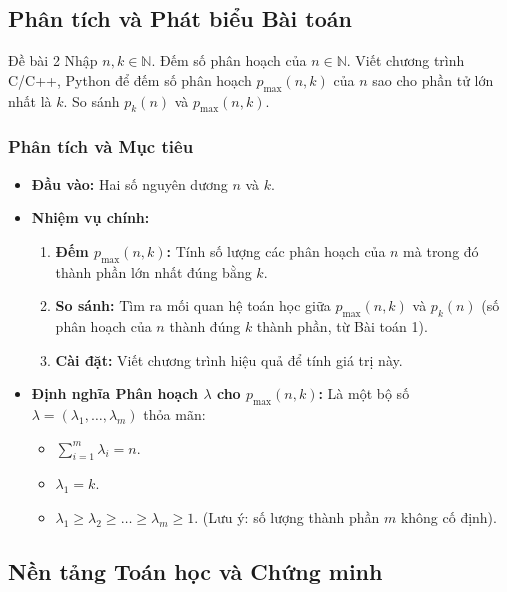 \documentclass[a4paper,12pt]{article}
\begin{document}
\subsection{Phân tích và Phát biểu Bài toán}

\begin{problembox}{Đề bài 2}
    Nhập $n, k \in \mathbb{N}$. Đếm số phân hoạch của $n \in \mathbb{N}$. Viết chương trình C/C++, Python để đếm số phân hoạch $p_{\max}(n, k)$ của $n$ sao cho phần tử lớn nhất là $k$. So sánh $p_k(n)$ và $p_{\max}(n, k)$.
\end{problembox}

\subsubsection{Phân tích và Mục tiêu}
\begin{itemize}
    \item \textbf{Đầu vào:} Hai số nguyên dương $n$ và $k$.
    \item \textbf{Nhiệm vụ chính:}
    \begin{enumerate}
        \item \textbf{Đếm $p_{\max}(n, k)$:} Tính số lượng các phân hoạch của $n$ mà trong đó thành phần lớn nhất đúng bằng $k$.
        \item \textbf{So sánh:} Tìm ra mối quan hệ toán học giữa $p_{\max}(n, k)$ và $p_k(n)$ (số phân hoạch của $n$ thành đúng $k$ thành phần, từ Bài toán 1).
        \item \textbf{Cài đặt:} Viết chương trình hiệu quả để tính giá trị này.
    \end{enumerate}
    \item \textbf{Định nghĩa Phân hoạch $\lambda$ cho $p_{\max}(n, k)$:} Là một bộ số $\lambda = (\lambda_1, \dots, \lambda_m)$ thỏa mãn:
    \begin{itemize}
        \item $\sum_{i=1}^{m} \lambda_i = n$.
        \item $\lambda_1 = k$.
        \item $\lambda_1 \ge \lambda_2 \ge \dots \ge \lambda_m \ge 1$. (Lưu ý: số lượng thành phần $m$ không cố định).
    \end{itemize}
\end{itemize}

\subsection{Nền tảng Toán học và Chứng minh}
\end{document}
